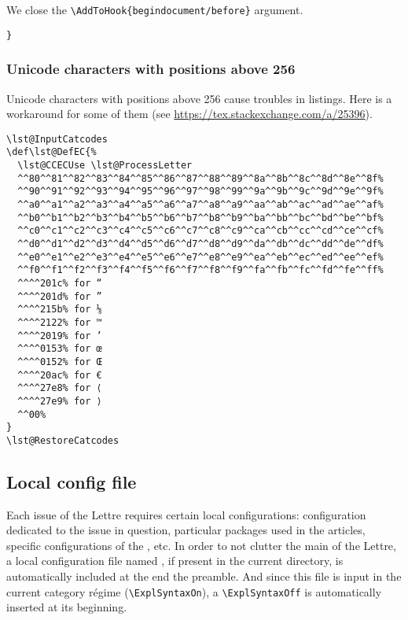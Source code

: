 \documentclass{letgut}
\begin{document}
We close the \lstinline+\AddToHook{begindocument/before}+ argument.

\begin{lstlisting}
}
\end{lstlisting}

\subsubsection{Unicode characters with positions above 256}
\label{ImplementationListingsUnicodecharacterswithpositionsabove256-4l6h55h0jlj0}
Unicode characters with positions above 256 cause troubles in
listings. Here is a workaround for some of them (see
\url{https://tex.stackexchange.com/a/25396}).

\begin{lstlisting}
\lst@InputCatcodes
\def\lst@DefEC{%
  \lst@CCECUse \lst@ProcessLetter
  ^^80^^81^^82^^83^^84^^85^^86^^87^^88^^89^^8a^^8b^^8c^^8d^^8e^^8f%
  ^^90^^91^^92^^93^^94^^95^^96^^97^^98^^99^^9a^^9b^^9c^^9d^^9e^^9f%
  ^^a0^^a1^^a2^^a3^^a4^^a5^^a6^^a7^^a8^^a9^^aa^^ab^^ac^^ad^^ae^^af%
  ^^b0^^b1^^b2^^b3^^b4^^b5^^b6^^b7^^b8^^b9^^ba^^bb^^bc^^bd^^be^^bf%
  ^^c0^^c1^^c2^^c3^^c4^^c5^^c6^^c7^^c8^^c9^^ca^^cb^^cc^^cd^^ce^^cf%
  ^^d0^^d1^^d2^^d3^^d4^^d5^^d6^^d7^^d8^^d9^^da^^db^^dc^^dd^^de^^df%
  ^^e0^^e1^^e2^^e3^^e4^^e5^^e6^^e7^^e8^^e9^^ea^^eb^^ec^^ed^^ee^^ef%
  ^^f0^^f1^^f2^^f3^^f4^^f5^^f6^^f7^^f8^^f9^^fa^^fb^^fc^^fd^^fe^^ff%
  ^^^^201c% for “
  ^^^^201d% for ”
  ^^^^215b% for ⅛
  ^^^^2122% for ™
  ^^^^2019% for ’
  ^^^^0153% for œ
  ^^^^0152% for Œ
  ^^^^20ac% for €
  ^^^^27e8% for ⟨
  ^^^^27e9% for ⟩
  ^^00%
}
\lst@RestoreCatcodes
\end{lstlisting}

\subsection{Local config file}
\label{ImplementationLocalconfigfile-me7h55h0jlj0}
Each issue of the Lettre requires certain local configurations: configuration
dedicated to the issue in question, particular packages used in the articles,
specific configurations of the , etc. In order to not clutter
the main  of the Lettre, a local configuration file named
, if present in the current directory, is automatically
included at the end the preamble. And since this file is input in the current
category régime (\lstinline+\ExplSyntaxOn+), a \lstinline+\ExplSyntaxOff+ is automatically inserted
at its beginning.
\end{document}
